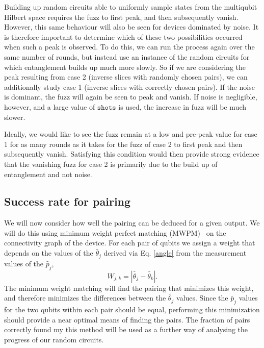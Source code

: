 \documentclass[aps,prl,twocolumn,showpacs,preprintnumbers]{revtex4-1}
\newcommand{\be}{\begin{equation}}
\newcommand{\ee}{\end{equation}}
\begin{document}
Building up random circuits able to uniformly sample states from the multiqubit Hilbert space requires the fuzz to first peak, and then subsequently vanish. However, this same behaviour will also be seen for devices dominated by noise. It is therefore important to determine which of these two possibilities occurred when such a peak is observed. To do this, we can run the process again over the same number of rounds, but instead use an instance of the random circuits for which entanglement builds up much more slowly. So if we are considering the peak resulting from case 2 (inverse slices with randomly chosen pairs), we can additionally study case 1 (inverse slices with correctly chosen pairs). If the noise is dominant, the fuzz will again be seen to peak and vanish. If noise is negligible, however, and a large value of $\mathtt{shots}$ is used, the increase in fuzz will be much slower.

Ideally, we would like to see the fuzz remain at a low and pre-peak value for case 1 for as many rounds as it takes for the fuzz of case 2 to first peak and then subsequently vanish. Satisfying this condition would then provide strong evidence that the vanishing fuzz for case 2 is primarily due to the build up of entanglement and not noise.


\subsection{Success rate for pairing}

We will now consider how well the pairing can be deduced for a given output. We will do this using minimum weight perfect matching (MWPM)~\cite{edmonds:65,rantwijk} on the connectivity graph of the device. For each pair of qubits we assign a weight that depends on the values of the $\tilde{\theta_j}$ derived via Eq. \ref{angle} from the measurement values of the $\tilde{p_j}$,
\be \label{weight}
W_{j,k} = | \tilde{\theta_j} - \tilde{\theta_k} | .
\ee
The minimum weight matching will find the pairing that minimizes this weight, and therefore minimizes the differences between the $\tilde{\theta_j}$ values. Since the $\tilde{p_j}$ values for the two qubits within each pair should be equal, performing this minimization should provide a near optimal means of finding the pairs. The fraction of pairs correctly found my this method will be used as a further way of analysing the progress of our random circuits.
\end{document}
